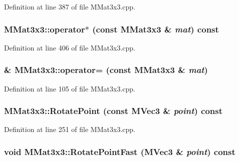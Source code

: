 Definition at line 387 of file MMat3x3.cpp.\hypertarget{class_m_mat3x3_41ee55d1d606a5018fe404e0e4938b84}{
\subsubsection[{operator$\ast$}]{ MMat3x3::operator$\ast$ (const {\bf MMat3x3} \& {\em mat}) const}}
\label{class_m_mat3x3_41ee55d1d606a5018fe404e0e4938b84}




Definition at line 406 of file MMat3x3.cpp.\hypertarget{class_m_mat3x3_893b3d2e337be1b09d3d694c23c0c3e6}{
\subsubsection[{operator=}]{ \& MMat3x3::operator= (const {\bf MMat3x3} \& {\em mat})}}
\label{class_m_mat3x3_893b3d2e337be1b09d3d694c23c0c3e6}




Definition at line 105 of file MMat3x3.cpp.\hypertarget{class_m_mat3x3_84fad6815686a050837119f242650324}{
\subsubsection[{RotatePoint}]{ MMat3x3::RotatePoint (const {\bf MVec3} \& {\em point}) const}}
\label{class_m_mat3x3_84fad6815686a050837119f242650324}




Definition at line 251 of file MMat3x3.cpp.\hypertarget{class_m_mat3x3_15242b646b6462a0f6fa44b324ff009c}{
\subsubsection[{RotatePointFast}]{\setlength{\rightskip}{0pt plus 5cm}void MMat3x3::RotatePointFast ({\bf MVec3} \& {\em point}) const}}
\label{class_m_mat3x3_15242b646b6462a0f6fa44b324ff009c}




